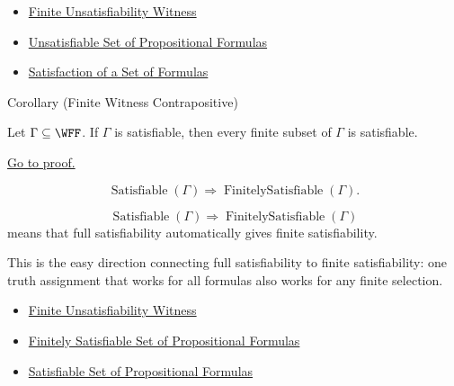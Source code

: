 \begin{dependencies}
\begin{itemize}
  \item \hyperref[def:finite-unsatisfiability-witness-propositional-logic]{Finite Unsatisfiability Witness}
  \item \hyperref[def:unsatisfiable-set-of-propositional-formulas]{Unsatisfiable Set of Propositional Formulas}
  \item \hyperref[def:satisfaction-set-propositional-logic]{Satisfaction of a Set of Formulas}
\end{itemize}
\end{dependencies}

\begin{corollarybox}{Corollary (Finite Witness Contrapositive)}
\begin{corollary}
\label{cor:finite-unsatisfiability-witness-contrapositive-propositional-logic}
Let \(\Gamma\subseteq\WFF\). If \(\Gamma\) is satisfiable, then every finite
subset of \(\Gamma\) is satisfiable.

\medskip
\noindent\hyperref[prf:finite-unsatisfiability-witness-contrapositive-propositional-logic]{Go to proof.}
\end{corollary}
\end{corollarybox}

\begin{remark*}
\[
\operatorname{Satisfiable}(\Gamma)
\Rightarrow
\operatorname{FinitelySatisfiable}(\Gamma).
\]
\end{remark*}

\begin{remark*}
\[
\operatorname{Satisfiable}(\Gamma)
\Rightarrow
\operatorname{FinitelySatisfiable}(\Gamma)
\]
means that full satisfiability automatically gives finite satisfiability.
\end{remark*}

\begin{remark*}[Interpretation]
This is the easy direction connecting full satisfiability to finite
satisfiability: one truth assignment that works for all formulas also works
for any finite selection.
\end{remark*}

\begin{dependencies}
\begin{itemize}
  \item \hyperref[thm:finite-unsatisfiability-witness-propositional-logic]{Finite Unsatisfiability Witness}
  \item \hyperref[def:finitely-satisfiable-set-of-propositional-formulas]{Finitely Satisfiable Set of Propositional Formulas}
  \item \hyperref[def:satisfiable-set-of-propositional-formulas]{Satisfiable Set of Propositional Formulas}
\end{itemize}
\end{dependencies}
